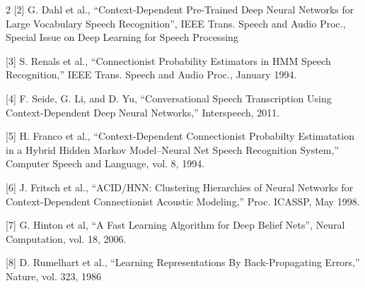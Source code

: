 \documentclass{article}
\begin{document}
\begin{multicols}{2}
[2] G. Dahl et al., “Context-Dependent Pre-Trained Deep
Neural Networks for Large Vocabulary Speech Recognition”, IEEE Trans. Speech and Audio Proc., Special
Issue on Deep Learning for Speech Processing

[3] S. Renals et al., “Connectionist Probability Estimators in HMM Speech Recognition,” IEEE
Trans. Speech and Audio Proc., January 1994.

[4] F. Seide, G. Li, and D. Yu, “Conversational Speech
Transcription Using Context-Dependent Deep Neural
Networks,” Interspeech, 2011.

[5] H. Franco et al., “Context-Dependent Connectionist Probabilty Estimatation in a Hybrid Hidden
Markov Model–Neural Net Speech Recognition System,” Computer Speech and Language, vol. 8, 1994.

[6] J. Fritsch et al., “ACID/HNN: Clustering Hierarchies
of Neural Networks for Context-Dependent Connectionist Acoustic Modeling,” Proc. ICASSP, May 1998.

[7] G. Hinton et al, “A Fast Learning Algorithm for Deep
Belief Nets”, Neural Computation, vol. 18, 2006.

[8] D. Rumelhart et al., “Learning Representations By
Back-Propagating Errors,” Nature, vol. 323, 1986
\end{multicols}
\twocolumn




\end{document}
